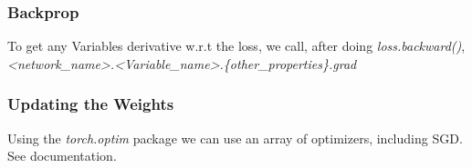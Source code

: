 \documentclass[]{report}
\newcommand{\tif}{\textit}
\begin{document}
\subsubsection{Backprop}
To get any Variables derivative w.r.t the loss, we call, after doing \tif{loss.backward()}, \tif{<network\_name>.<Variable\_name>.\{other\_properties\}.grad}

\subsubsection{Updating the Weights}
Using the \textit{torch.optim} package we can use an array of optimizers, including SGD. See documentation. 
\end{document}
